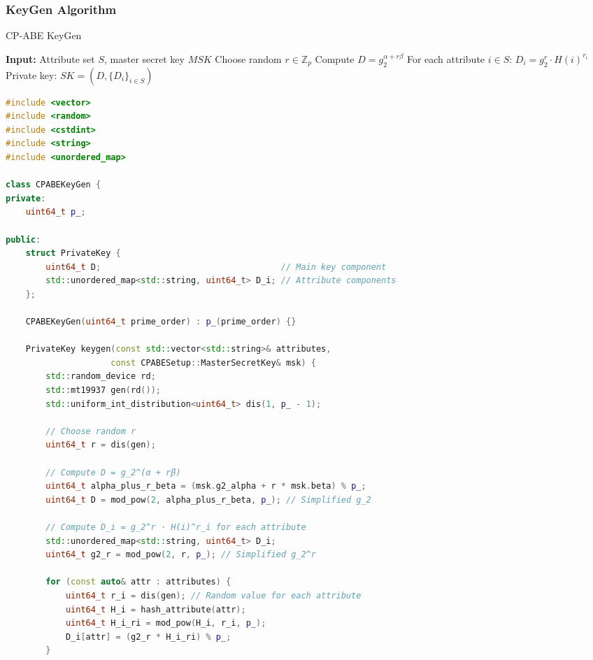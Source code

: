 \documentclass[11pt,a4paper]{article}
\begin{document}
\subsubsection{KeyGen Algorithm}

\begin{algorithm}
\caption{CP-ABE KeyGen}
\begin{algorithmic}
\STATE \textbf{Input:} Attribute set $S$, master secret key $MSK$
\STATE Choose random $r \in \mathbb{Z}_p$
\STATE Compute $D = g_2^{\alpha + r\beta}$
\STATE For each attribute $i \in S$: $D_i = g_2^r \cdot H(i)^{r_i}$
\STATE Private key: $SK = (D, \{D_i\}_{i \in S})$
\end{algorithmic}
\end{algorithm}

\begin{lstlisting}[language=C++, caption=CP-ABE KeyGen Implementation]
#include <vector>
#include <random>
#include <cstdint>
#include <string>
#include <unordered_map>

class CPABEKeyGen {
private:
    uint64_t p_;
    
public:
    struct PrivateKey {
        uint64_t D;                                    // Main key component
        std::unordered_map<std::string, uint64_t> D_i; // Attribute components
    };
    
    CPABEKeyGen(uint64_t prime_order) : p_(prime_order) {}
    
    PrivateKey keygen(const std::vector<std::string>& attributes,
                     const CPABESetup::MasterSecretKey& msk) {
        std::random_device rd;
        std::mt19937 gen(rd());
        std::uniform_int_distribution<uint64_t> dis(1, p_ - 1);
        
        // Choose random r
        uint64_t r = dis(gen);
        
        // Compute D = g_2^(α + rβ)
        uint64_t alpha_plus_r_beta = (msk.g2_alpha + r * msk.beta) % p_;
        uint64_t D = mod_pow(2, alpha_plus_r_beta, p_); // Simplified g_2
        
        // Compute D_i = g_2^r · H(i)^r_i for each attribute
        std::unordered_map<std::string, uint64_t> D_i;
        uint64_t g2_r = mod_pow(2, r, p_); // Simplified g_2^r
        
        for (const auto& attr : attributes) {
            uint64_t r_i = dis(gen); // Random value for each attribute
            uint64_t H_i = hash_attribute(attr);
            uint64_t H_i_ri = mod_pow(H_i, r_i, p_);
            D_i[attr] = (g2_r * H_i_ri) % p_;
        }
        

\end{lstlisting}
\end{document}
